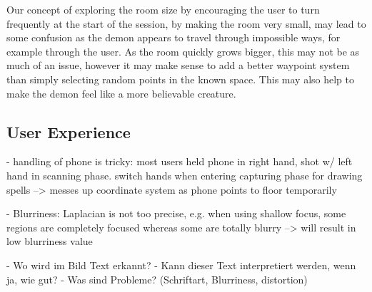 Our concept of exploring the room size by encouraging the user to turn frequently at the start of the session, by making the room very small, may lead to some confusion as the demon appears to travel through impossible ways, for example through the user.
As the room quickly grows bigger, this may not be as much of an issue, however it may make sense to add a better waypoint system than simply selecting random points in the known space.
This may also help to make the demon feel like a more believable creature.

\subsection{User Experience}
- handling of phone is tricky: most users held phone in right hand, shot w/ left hand in scanning phase. switch hands when entering capturing phase for drawing spells --> messes up coordinate system as phone points to floor temporarily

- Blurriness: Laplacian is not too precise, e.g. when using shallow focus, some regions are completely focused whereas some are totally blurry
--> will result in low blurriness value


- Wo wird im Bild Text erkannt?
- Kann dieser Text interpretiert werden, wenn ja, wie gut?
- Was sind Probleme? (Schriftart, Blurriness, distortion)

